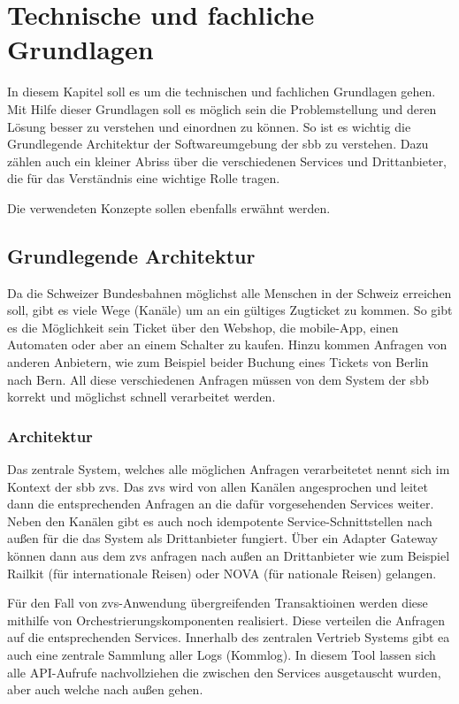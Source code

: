 \section{Technische und fachliche Grundlagen}
In diesem Kapitel soll es um die technischen und fachlichen Grundlagen gehen. Mit Hilfe dieser Grundlagen soll es möglich sein die Problemstellung und deren Lösung besser zu verstehen und einordnen zu können.
So ist es wichtig die Grundlegende Architektur der Softwareumgebung der \ac{sbb} zu verstehen. Dazu zählen auch ein kleiner Abriss über die verschiedenen Services und Drittanbieter, die für das Verständnis eine wichtige Rolle tragen.

Die verwendeten Konzepte sollen ebenfalls erwähnt werden.

\subsection{Grundlegende Architektur}

Da die Schweizer Bundesbahnen möglichst alle Menschen in der Schweiz erreichen soll, gibt es viele Wege (Kanäle) um an ein gültiges Zugticket zu kommen. So gibt es die Möglichkeit sein Ticket über den Webshop, die mobile-App, einen Automaten oder aber an einem Schalter zu kaufen. Hinzu kommen Anfragen von anderen Anbietern, wie zum Beispiel beider Buchung eines Tickets von Berlin nach Bern. All diese verschiedenen Anfragen müssen von dem System der \ac{sbb} korrekt und möglichst schnell verarbeitet werden.

\subsubsection{Architektur}

Das zentrale System, welches alle möglichen Anfragen verarbeitetet nennt sich im Kontext der \ac{sbb} \ac{zvs}. Das \ac{zvs} wird von allen Kanälen angesprochen und leitet dann die entsprechenden Anfragen an die dafür vorgesehenden Services weiter. Neben den Kanälen gibt es auch noch idempotente Service-Schnittstellen nach außen für die das System als Drittanbieter fungiert. Über ein Adapter Gateway können dann aus dem \ac{zvs} anfragen nach außen an Drittanbieter wie zum Beispiel Railkit (für internationale Reisen) oder NOVA (für nationale Reisen) gelangen.

Für den Fall von \ac{zvs}-Anwendung übergreifenden Transaktioinen werden diese mithilfe von Orchestrierungskomponenten realisiert. Diese verteilen die Anfragen auf die entsprechenden Services. Innerhalb des zentralen Vertrieb Systems gibt ea auch eine zentrale Sammlung aller Logs (Kommlog). In diesem Tool lassen sich alle API-Aufrufe nachvollziehen die zwischen den Services ausgetauscht wurden, aber auch welche nach außen gehen.

